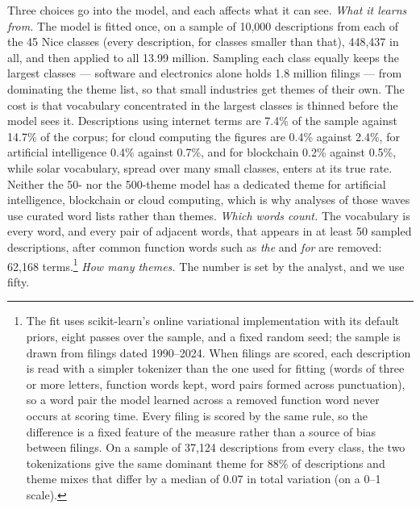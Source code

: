 Three choices go into the model, and each affects what it can see.
\emph{What it learns from.} The model is fitted once, on a sample of
10{,}000 descriptions from each of the 45 Nice classes (every description,
for classes smaller than that), 448{,}437 in all, and then applied to all
13.99 million. Sampling each class equally keeps the largest classes ---
software and electronics alone holds 1.8 million filings --- from
dominating the theme list, so that small industries get themes of their
own. The cost is that vocabulary concentrated in the largest classes is
thinned before the model sees it. Descriptions using internet terms are
7.4\% of the sample against 14.7\% of the corpus; for cloud computing the
figures are 0.4\% against 2.4\%, for artificial intelligence 0.4\% against
0.7\%, and for blockchain 0.2\% against 0.5\%, while solar vocabulary,
spread over many small classes, enters at its true rate. Neither the 50-
nor the 500-theme model has a dedicated theme for artificial
intelligence, blockchain or cloud computing, which is why analyses of
those waves use curated word lists rather than themes. \emph{Which words count.} The vocabulary is every word, and every pair
of adjacent words, that appears in at least 50 sampled descriptions,
after common function words such as \emph{the} and \emph{for} are
removed: 62{,}168 terms.\footnote{The fit uses scikit-learn's online
variational implementation with its default priors, eight passes over
the sample, and a fixed random seed; the sample is drawn from filings
dated 1990--2024. When filings are scored, each description is read with
a simpler tokenizer than the one used for fitting (words of three or
more letters, function words kept, word pairs formed across
punctuation), so a word pair the model learned across a removed
function word never occurs at scoring time. Every filing is scored by
the same rule, so the difference is a fixed feature of the measure
rather than a source of bias between filings. On a sample of 37{,}124
descriptions from every class, the two tokenizations give the same
dominant theme for 88\% of descriptions and theme mixes that differ by
a median of 0.07 in total variation (on a 0--1 scale).} \emph{How many
themes.} The number is set by the analyst, and we use fifty.

